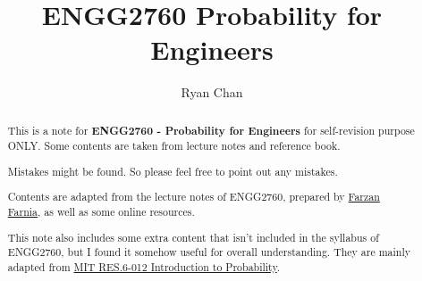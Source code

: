 \documentclass[a4paper]{report}
\author{Ryan Chan}
\title{ENGG2760 Probability for Engineers}
\begin{document}
\setlength\parindent{0pt}


\maketitle

\newpage

\begin{abstract}
	This is a note for \textbf{ENGG2760 - Probability for Engineers} for self-revision purpose ONLY. Some contents are taken from lecture notes and reference book. 
	
	Mistakes might be found. So please feel free to point out any mistakes.

	Contents are adapted from the lecture notes of ENGG2760, prepared by \href{https://www.cse.cuhk.edu.hk/~farnia/}{Farzan Farnia}, as well as some online resources.

	This note also includes some extra content that isn't included in the syllabus of ENGG2760, but I found it somehow useful for overall understanding. They are mainly adapted from \href{https://ocw.mit.edu/RES-6-012S18}{MIT RES.6-012 Introduction to Probability}.
\end{abstract}

\newpage

\tableofcontents

\setlength{\parskip}{5pt}
\end{document}
